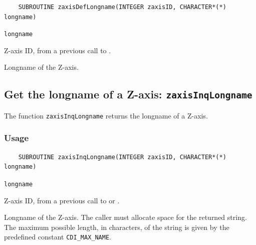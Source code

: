 \begin{verbatim}
    SUBROUTINE zaxisDefLongname(INTEGER zaxisID, CHARACTER*(*) longname)
\end{verbatim}

\hspace*{4mm}\begin{minipage}[]{15cm}
\begin{deflist}{\texttt{longname}\ }
\item[\texttt{zaxisID}]
Z-axis ID, from a previous call to {}.
\item[\texttt{longname}]
Longname of the Z-axis.

\end{deflist}
\end{minipage}


\subsection{Get the longname of a Z-axis: \texttt{zaxisInqLongname}}
\label{zaxisInqLongname}

The function {\texttt{zaxisInqLongname}} returns the longname of a Z-axis.

\subsubsection*{Usage}

\begin{verbatim}
    SUBROUTINE zaxisInqLongname(INTEGER zaxisID, CHARACTER*(*) longname)
\end{verbatim}

\hspace*{4mm}\begin{minipage}[]{15cm}
\begin{deflist}{\texttt{longname}\ }
\item[\texttt{zaxisID}]
Z-axis ID, from a previous call to {} or {}.
\item[\texttt{longname}]
Longname of the Z-axis. The caller must allocate space for the
                    returned string. The maximum possible length, in characters, of
                    the string is given by the predefined constant {\texttt{CDI\_MAX\_NAME}}.

\end{deflist}
\end{minipage}

